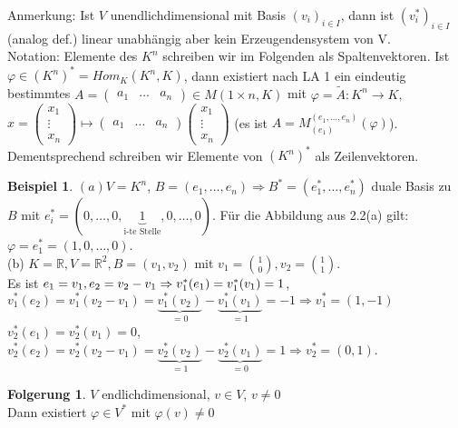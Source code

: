 \documentclass[10pt,a4paper,numbers=endperiod]{scrartcl}
\theoremstyle{definition}
\newtheorem{bsp}[satz]{Beispiel}
\newtheorem{folg}[satz]{Folgerung}
\def\RR{{\mathbb R}}
\begin{document}
Anmerkung: Ist $V$ unendlichdimensional mit Basis $(v_i)_{i \in I}$, dann ist $(v_i^*)_{i \in I}$ (analog def.) linear unabhängig aber kein Erzeugendensystem von V.\\

Notation: Elemente des $K^n$ schreiben wir im Folgenden als Spaltenvektoren. Ist $\varphi \in (K^n)^* = Hom_K (K^n, K)$, dann existiert nach LA 1 ein eindeutig bestimmtes $A = \begin{pmatrix}
a_1 & \dots & a_n
\end{pmatrix} \in M(1 \times n, K)$ mit $\varphi = \tilde{A} : K^n \rightarrow K,$\\ $x = \begin{pmatrix}
x_1\\
\vdots\\
x_n
\end{pmatrix} \mapsto \begin{pmatrix}
a_1 & \dots & a_n
\end{pmatrix} \begin{pmatrix}
x_1\\
\vdots\\
x_n
\end{pmatrix}$ (es ist $A = M_{(e_1)}^{(e_1,\ldots,e_n)}(\varphi)$).\\ Dementsprechend schreiben wir Elemente von $(K^n)^*$ als Zeilenvektoren.\\

\begin{bsp}
$(a) V = K^n$, $B = (e_1, \ldots, e_n) \Rightarrow B^* = (e_1^*, \ldots, e_n^*)$ duale Basis zu $B$ mit $e_i^* = (0, \ldots,0, \underbrace{1}_{\text{i-te Stelle}},0,\ldots,0)$. Für die Abbildung aus 2.2(a) gilt: $\varphi = e_1^* = (1,0,\ldots,0)$.\\
(b) $K = \RR, V = \RR^2, B = (v_1, v_2)$ mit $v_1 = \binom{1}{0}, v_2 = \binom{1}{1}$.\\ Es ist $e_1 = v_1, e_2 = v_2 - v_1\\ \Rightarrow v_1^*(e_1) = v_1^*(v_1) = 1$, $v_1^*(e_2) = v_1^*(v_2-v_1) = \underbrace{v_1^*(v_2)}_{= 0} - \underbrace{v_1^*(v_1)}_{= 1} = -1 \Rightarrow v_1^* = (1, -1)$\\
$v_2^* (e_1) = v_2^*(v_1) = 0$, $v_2^*(e_2) = v_2^*(v_2-v_1) = \underbrace{v_2^*(v_2)}_{= 1} - \underbrace{v_2^*(v_1)}_{= 0} = 1 \Rightarrow v_2^* = (0,1)$. 
\end{bsp}

\begin{folg}
	$V$ endlichdimensional, $v \in V$, $v \neq 0$\\
	Dann existiert $\varphi \in V^*$ mit $\varphi(v) \neq 0$
\end{folg}
\end{document}
